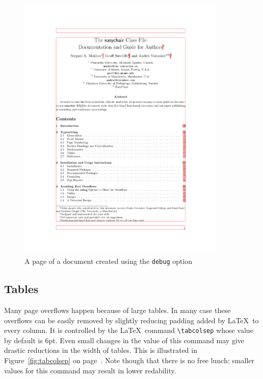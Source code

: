 \documentclass{easychair}
\begin{document}
\begin{figure}
  \begin{centering}
    \includegraphics[width=0.89\textwidth]{debug.pdf}
    \caption{A page of a document created using the \texttt{debug}
      option} 
    \label{fig:redframe}
  \end{centering}
\end{figure}

\subsection{Tables}

Many page overflows happen because of large tables. In many case these
overflows can be easily removed by slightly reducing padding added by
\LaTeX\ to every column. It is controlled by the \LaTeX\ command
\verb|\tabcolsep| whose value by default is 6pt. Even small changes in
the value of this command may give drastic reductions in the width of
tables. This is illustrated in Figure~\ref{fig:tabcolsep} on
page~\pageref{fig:tabcolsep}. Note though that there is no free lunch:
smaller values for this command may result in lower redability.
\end{document}

